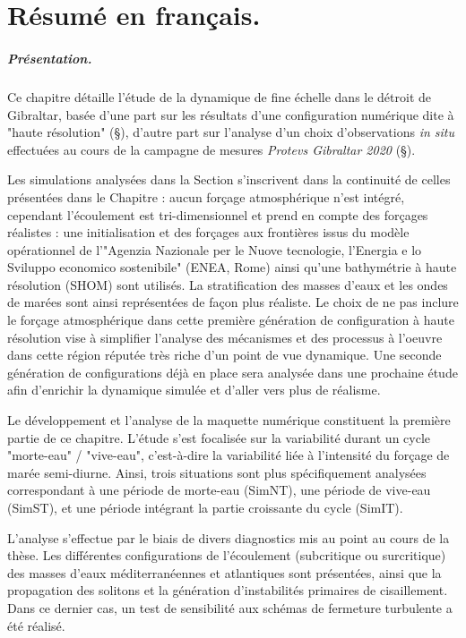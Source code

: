 
\section{Résumé en français.}

\subparagraph{Présentation.}
Ce chapitre détaille l'étude de la dynamique de fine échelle dans le détroit de Gibraltar, basée d'une part sur les résultats d'une configuration numérique dite à "haute résolution" (\S {}), d'autre part sur l'analyse d'un choix d'observations \textit{in situ} effectuées au cours de la campagne de mesures \textit{Protevs Gibraltar 2020} (\S  {}).

Les simulations analysées dans la Section  s'inscrivent dans la continuité de celles présentées dans le Chapitre : aucun forçage atmosphérique n'est intégré, cependant l'écoulement est tri-dimensionnel et prend en compte des forçages réalistes : une initialisation et des forçages aux frontières issus du modèle opérationnel de l'"Agenzia Nazionale per le Nuove tecnologie, l'Energia e lo Sviluppo economico sostenibile" (ENEA, Rome) ainsi qu'une bathymétrie à haute résolution (SHOM) sont  utilisés. La stratification des masses d'eaux et les ondes de marées sont ainsi représentées de façon plus réaliste. Le choix de ne pas inclure le forçage atmosphérique dans cette première génération de configuration à haute résolution vise à simplifier l'analyse des mécanismes et des processus à l'oeuvre dans cette région réputée très riche d'un point de vue dynamique. Une seconde génération de configurations déjà en place sera analysée dans une prochaine étude afin d'enrichir la dynamique simulée et d'aller  vers plus de réalisme. 

Le développement et l'analyse de la maquette numérique constituent la première partie de ce chapitre. L'étude s'est focalisée sur la variabilité durant un cycle "morte-eau" / "vive-eau", c'est-à-dire la variabilité liée à l'intensité du forçage de marée semi-diurne. Ainsi, trois situations sont plus spécifiquement analysées correspondant à une période de morte-eau (SimNT), une période de vive-eau (SimST), et une période intégrant la partie croissante du cycle (SimIT).

L'analyse s'effectue par le biais de divers diagnostics mis au point au cours de la thèse. Les différentes configurations de l'écoulement (subcritique ou surcritique) des masses d'eaux méditerranéennes et atlantiques sont présentées, ainsi que la propagation des solitons et la génération d'instabilités primaires de cisaillement. Dans ce dernier cas, un test de sensibilité aux schémas de fermeture turbulente a été réalisé.

